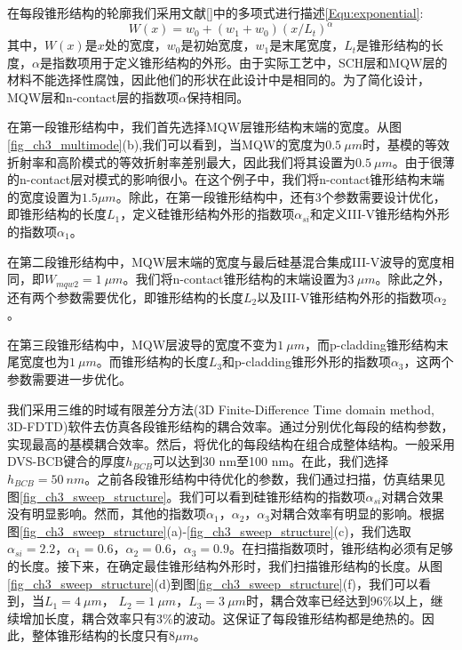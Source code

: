 在每段锥形结构的轮廓我们采用文献[]中的多项式进行描述\ref{Equ:exponential}:
\begin{equation}
\label{Equ:exponential}
W(x) = w_0+(w_1+w_0)\left(x/L_t\right)^\alpha
\end{equation}
其中，$W(x)$是$x$处的宽度，$w_0$是初始宽度，$w_1$是末尾宽度，$L_t$是锥形结构的长度，$\alpha$是指数项用于定义锥形结构的外形。由于实际工艺中，SCH层和MQW层的材料不能选择性腐蚀，因此他们的形状在此设计中是相同的。为了简化设计，MQW层和n-contact层的指数项$\alpha$保持相同。

在第一段锥形结构中，我们首先选择MQW层锥形结构末端的宽度。从图\ref{fig_ch3_multimode}(b),我们可以看到，当MQW的宽度为$0.5 ~ \mu m$时，基模的等效折射率和高阶模式的等效折射率差别最大，因此我们将其设置为$0.5 ~ \mu m$。由于很薄的n-contact层对模式的影响很小。在这个例子中，我们将n-contact锥形结构末端的宽度设置为$1.5 \mu m$。除此，在第一段锥形结构中，还有3个参数需要设计优化，即锥形结构的长度$L_1$，定义硅锥形结构外形的指数项$\alpha_{si}$和定义III-V锥形结构外形的指数项$\alpha_1$。

在第二段锥形结构中，MQW层末端的宽度与最后硅基混合集成III-V波导的宽度相同，即$W_{mqw2} = 1~\mu m$。我们将n-contact锥形结构的末端设置为$3~\mu m$。除此之外，还有两个参数需要优化，即锥形结构的长度$L_2$以及III-V锥形结构外形的指数项$\alpha_2$。

在第三段锥形结构中，MQW层波导的宽度不变为$1~\mu m$，而p-cladding锥形结构末尾宽度也为$1~\mu m$。而锥形结构的长度$L_3$和p-cladding锥形外形的指数项$\alpha_3$，这两个参数需要进一步优化。

我们采用三维的时域有限差分方法(3D Finite-Difference Time domain method, 3D-FDTD)软件去仿真各段锥形结构的耦合效率\cite{fdtdsolution}。通过分别优化每段的结构参数，实现最高的基模耦合效率。然后，将优化的每段结构在组合成整体结构。一般采用DVS-BCB键合的厚度$h_{BCB}$可以达到30 nm至100 nm。在此，我们选择$h_{BCB} = 50~nm$。之前各段锥形结构中待优化的参数，我们通过扫描，仿真结果见图\ref{fig_ch3_sweep_structure}。我们可以看到硅锥形结构的指数项$\alpha_{si}$对耦合效果没有明显影响。然而，其他的指数项$\alpha_1$，$\alpha_2$，$\alpha_3$对耦合效率有明显的影响。根据图\ref{fig_ch3_sweep_structure}(a)-\ref{fig_ch3_sweep_structure}(c)，我们选取$\alpha_{si} = 2.2$，$\alpha_1 = 0.6$，$\alpha_2 = 0.6$，$ \alpha_3 = 0.9$。在扫描指数项时，锥形结构必须有足够的长度。接下来，在确定最佳锥形结构外形时，我们扫描锥形结构的长度。从图\ref{fig_ch3_sweep_structure}(d)到图\ref{fig_ch3_sweep_structure}(f)，我们可以看到，当$L_1 = 4~ \mu m$， $L_2 = 1~\mu m$，$ L_3 =  3~\mu m $时，耦合效率已经达到96\%以上，继续增加长度，耦合效率只有3\%的波动。这保证了每段锥形结构都是绝热的。因此，整体锥形结构的长度只$有8 \mu m$。

